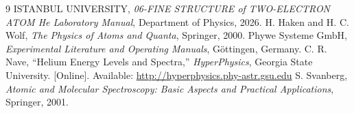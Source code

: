 \documentclass[journal]{IEEEtran}
\begin{document}
\begin{thebibliography}{9}
    ISTANBUL UNIVERSITY, \textit{06-FINE STRUCTURE of TWO-ELECTRON ATOM He Laboratory Manual}, Department of Physics, 2026.
    H. Haken and H. C. Wolf, \textit{The Physics of Atoms and Quanta}, Springer, 2000.
    Phywe Systeme GmbH, \textit{Experimental Literature and Operating Manuals}, G\"ottingen, Germany.
    C. R. Nave, ``Helium Energy Levels and Spectra,'' \textit{HyperPhysics}, Georgia State University. [Online]. Available: \url{http://hyperphysics.phy-astr.gsu.edu}
    S. Svanberg, \textit{Atomic and Molecular Spectroscopy: Basic Aspects and Practical Applications}, Springer, 2001.
\end{thebibliography}
\end{document}
